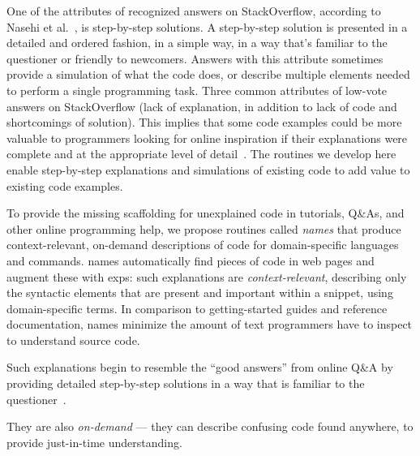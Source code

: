 \begin{changes}
One of the attributes of recognized answers on StackOverflow, according to Nasehi et al.~\cite{nasehi_what_2012}, is step-by-step solutions.
A step-by-step solution is presented in a detailed and ordered fashion, in a simple way, in a way that's familiar to the questioner or friendly to newcomers.
Answers with this attribute sometimes provide a simulation of what the code does, or describe multiple elements needed to perform a single programming task. 
Three common attributes of low-vote answers on StackOverflow (lack of explanation, in addition to lack of code and shortcomings of solution).
This implies that some code examples could be more valuable to programmers looking for online inspiration if their explanations were complete and at the appropriate level of detail~\cite{nasehi_what_2012}.
\fi
The routines we develop here enable step-by-step explanations and simulations of existing code to add value to existing code examples.
\end{changes}
\fi

To provide the missing scaffolding for unexplained code in tutorials, Q\&As, and other online programming help, we propose routines called \emph{\Glspl{name}} that produce context-relevant, on-demand descriptions of code for domain-specific languages and commands.
\Glspl{name} automatically find pieces of code in web pages and augment these with \glspl{exp}: such explanations are \emph{context-relevant}, describing only the syntactic elements that are present and important within a snippet, using domain-specific terms.
In comparison to getting-started guides and reference documentation, \Glspl{name} minimize the amount of text programmers have to inspect to understand source code.
\begin{changes}
Such explanations begin to resemble the ``good answers'' from online Q\&A by providing detailed step-by-step solutions in a way that is familiar to the questioner~\cite{nasehi_what_2012}.
\end{changes}
\fi
They are also \emph{on-demand} --- they can describe confusing code found anywhere, to provide just-in-time understanding.

